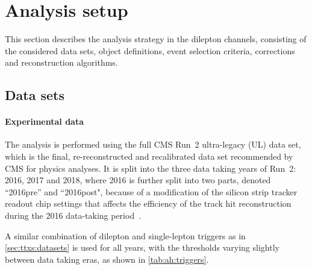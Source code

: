 \section{Analysis setup}
\label{sec:ah:setup}

This section describes the analysis strategy in the dilepton channels, consisting of the considered data sets, object definitions, event selection criteria, corrections and reconstruction algorithms.

\subsection{Data sets}
\label{sec:ah:datasets}

\paragraph{Experimental data} 
The analysis is performed using the full CMS Run~2 ultra-legacy (UL) data set, which is the final, re-reconstructed and recalibrated data set recommended by CMS for physics analyses. It is split into the three data taking years of Run~2: 2016, 2017 and 2018, where 2016 is further split into two parts, denoted ``2016pre'' and ``2016post", because of a modification of the silicon strip tracker readout chip settings that affects the efficiency of the track hit reconstruction during the 2016 data-taking period~\cite{CMS-DP-2020-045}.

A similar combination of dilepton and single-lepton triggers as in \cref{sec:ttxs:datasets} is used for all years, with the \pt thresholds varying slightly between data taking eras, as shown in \cref{tab:ah:triggers}. 

